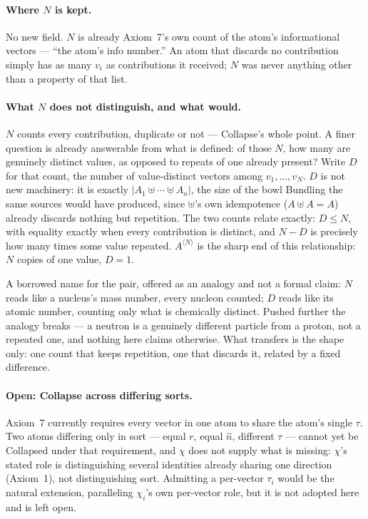 \documentclass[12pt, a4paper]{article}
\begin{document}
\paragraph{Where $N$ is kept.} No new field. $N$ is already Axiom~7's
own count of the atom's informational vectors --- ``the atom's info
number.'' An atom that discards no contribution simply has as many
$v_i$ as contributions it received; $N$ was never anything other than
a property of that list.

\paragraph{What $N$ does not distinguish, and what would.} $N$ counts
every contribution, duplicate or not --- Collapse's whole point. A
finer question is already answerable from what is defined: of those
$N$, how many are genuinely distinct values, as opposed to repeats of
one already present? Write $D$ for that count, the number of
value-distinct vectors among $v_1,\ldots,v_N$. $D$ is not new
machinery: it is exactly $|A_1\uplus\cdots\uplus A_n|$, the size of
the bowl Bundling the same sources would have produced, since
$\uplus$'s own idempotence ($A\uplus A=A$) already discards nothing
but repetition. The two counts relate exactly: $D\le N$, with
equality exactly when every contribution is distinct, and $N-D$ is
precisely how many times some value repeated. $A^{\langle N\rangle}$
is the sharp end of this relationship: $N$ copies of one value,
$D=1$.

A borrowed name for the pair, offered as an analogy and not a formal
claim: $N$ reads like a nucleus's mass number, every nucleon counted;
$D$ reads like its atomic number, counting only what is chemically
distinct. Pushed further the analogy breaks --- a neutron is a
genuinely different particle from a proton, not a repeated one, and
nothing here claims otherwise. What transfers is the shape only: one
count that keeps repetition, one that discards it, related by a
fixed difference.

\paragraph{Open: Collapse across differing sorts.} Axiom~7 currently
requires every vector in one atom to share the atom's single $\tau$.
Two atoms differing only in sort --- equal $r$, equal $\hat n$,
different $\tau$ --- cannot yet be Collapsed under that requirement,
and $\chi$ does not supply what is missing: $\chi$'s stated role is
distinguishing several identities already sharing one direction
(Axiom~1), not distinguishing sort. Admitting a per-vector
$\tau_i$ would be the natural extension, paralleling $\chi_i$'s own
per-vector role, but it is not adopted here and is left open.
\end{document}
